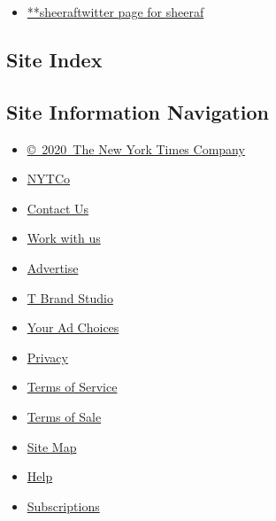 \begin{itemize}
\tightlist
\item
  \href{https://twitter.com/sheeraf}{**sheeraftwitter page for sheeraf}
\end{itemize}

\hypertarget{site-index}{%
\subsection{Site Index}\label{site-index}}

\hypertarget{site-information-navigation}{%
\subsection{Site Information
Navigation}\label{site-information-navigation}}

\begin{itemize}
\tightlist
\item
  \href{https://help.nytimes.com/hc/en-us/articles/115014792127-Copyright-notice}{©~2020~The
  New York Times Company}
\end{itemize}

\begin{itemize}
\tightlist
\item
  \href{https://www.nytco.com/}{NYTCo}
\item
  \href{https://help.nytimes.com/hc/en-us/articles/115015385887-Contact-Us}{Contact
  Us}
\item
  \href{https://www.nytco.com/careers/}{Work with us}
\item
  \href{https://nytmediakit.com/}{Advertise}
\item
  \href{http://www.tbrandstudio.com/}{T Brand Studio}
\item
  \href{https://www.nytimes.com/privacy/cookie-policy\#how-do-i-manage-trackers}{Your
  Ad Choices}
\item
  \href{https://www.nytimes.com/privacy}{Privacy}
\item
  \href{https://help.nytimes.com/hc/en-us/articles/115014893428-Terms-of-service}{Terms
  of Service}
\item
  \href{https://help.nytimes.com/hc/en-us/articles/115014893968-Terms-of-sale}{Terms
  of Sale}
\item
  \href{https://spiderbites.nytimes.com}{Site Map}
\item
  \href{https://help.nytimes.com/hc/en-us}{Help}
\item
  \href{https://www.nytimes.com/subscription?campaignId=37WXW}{Subscriptions}
\end{itemize}
